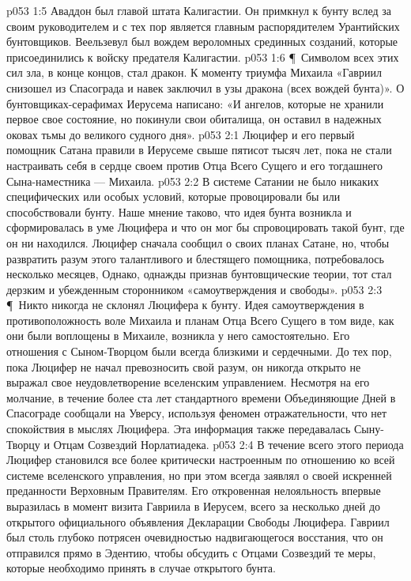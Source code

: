 \vs p053 1:5 Аваддон был главой штата Калигастии. Он примкнул к бунту вслед за своим руководителем и с тех пор является главным распорядителем Урантийских бунтовщиков. Веельзевул был вождем вероломных срединных созданий, которые присоединились к войску предателя Калигастии.
\vs p053 1:6 \P\ Символом всех этих сил зла, в конце концов, стал дракон. К моменту триумфа Михаила «Гавриил снизошел из Спасограда и навек заключил в узы дракона (всех вождей бунта)». О бунтовщиках\hyp{}серафимах Иерусема написано: «И ангелов, которые не хранили первое свое состояние, но покинули свои обиталища, он оставил в надежных оковах тьмы до великого судного дня».
\vs p053 2:1 Люцифер и его первый помощник Сатана правили в Иерусеме свыше пятисот тысяч лет, пока не стали настраивать себя в сердце своем против Отца Всего Сущего и его тогдашнего Сына\hyp{}наместника --- Михаила.
\vs p053 2:2 В системе Сатании не было никаких специфических или особых условий, которые провоцировали бы или способствовали бунту. Наше мнение таково, что идея бунта возникла и сформировалась в уме Люцифера и что он мог бы спровоцировать такой бунт, где он ни находился. Люцифер сначала сообщил о своих планах Сатане, но, чтобы развратить разум этого талантливого и блестящего помощника, потребовалось несколько месяцев, Однако, однажды признав бунтовщические теории, тот стал дерзким и убежденным сторонником «самоутверждения и свободы».
\vs p053 2:3 \P\ Никто никогда не склонял Люцифера к бунту. Идея самоутверждения в противоположность воле Михаила и планам Отца Всего Сущего в том виде, как они были воплощены в Михаиле, возникла у него самостоятельно. Его отношения с Сыном\hyp{}Творцом были всегда близкими и сердечными. До тех пор, пока Люцифер не начал превозносить свой разум, он никогда открыто не выражал свое неудовлетворение вселенским управлением. Несмотря на его молчание, в течение более ста лет стандартного времени Объединяющие Дней в Спасограде сообщали на Уверсу, используя феномен отражательности, что нет спокойствия в мыслях Люцифера. Эта информация также передавалась Сыну\hyp{}Творцу и Отцам Созвездий Норлатиадека.
\vs p053 2:4 В течение всего этого периода Люцифер становился все более критически настроенным по отношению ко всей системе вселенского управления, но при этом всегда заявлял о своей искренней преданности Верховным Правителям. Его откровенная нелояльность впервые выразилась в момент визита Гавриила в Иерусем, всего за несколько дней до открытого официального объявления Декларации Свободы Люцифера. Гавриил был столь глубоко потрясен очевидностью надвигающегося восстания, что он отправился прямо в Эдентию, чтобы обсудить с Отцами Созвездий те меры, которые необходимо принять в случае открытого бунта.

